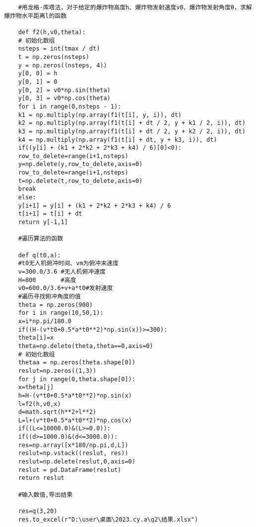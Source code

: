 \documentclass[normalsize]{ctexart}
\begin{document}
\begin{spacing}{1}
\begin{lstlisting}
	#用龙格-库塔法，对于给定的爆炸物高度h、爆炸物发射速度v0、爆炸物发射角度θ，求解爆炸物水平距离l的函数
	
	def f2(h,v0,theta):
	# 初始化数组
	nsteps = int(tmax / dt)
	t = np.zeros(nsteps)
	y = np.zeros((nsteps, 4))
	y[0, 0] = h
	y[0, 1] = 0 
	y[0, 2] = v0*np.sin(theta)
	y[0, 3] = v0*np.cos(theta)
	for i in range(0,nsteps - 1):
	k1 = np.multiply(np.array(f1(t[i], y, i)), dt)
	k2 = np.multiply(np.array(f1(t[i] + dt / 2, y + k1 / 2, i)), dt)
	k3 = np.multiply(np.array(f1(t[i] + dt / 2, y + k2 / 2, i)), dt)
	k4 = np.multiply(np.array(f1(t[i] + dt, y + k3, i)), dt)
	if((y[i] + (k1 + 2*k2 + 2*k3 + k4) / 6)[0]<0):
	row_to_delete=range(i+1,nsteps)
	y=np.delete(y,row_to_delete,axis=0)
	row_to_delete=range(i+1,nsteps)
	t=np.delete(t,row_to_delete,axis=0)
	break
	else:
	y[i+1] = y[i] + (k1 + 2*k2 + 2*k3 + k4) / 6
	t[i+1] = t[i] + dt
	return y[-1,1]
	
	#遍历算法的函数
	
	def q(t0,a):
	#t0无人机俯冲时间、vm为俯冲末速度
	v=300.0/3.6 #无人机俯冲速度
	H=800       #高度
	v0=600.0/3.6+v+a*t0#发射速度
	#遍历寻找俯冲角度的值
	theta = np.zeros(900)
	for i in range(10,50,1):
	x=i*np.pi/180.0
	if((H-(v*t0+0.5*a*t0**2)*np.sin(x))>=300):
	theta[i]=x
	theta=np.delete(theta,theta==0,axis=0)
	# 初始化数组
	thetaa = np.zeros(theta.shape[0])
	reslut=np.zeros((1,3))
	for j in range(0,theta.shape[0]):
	x=theta[j]
	h=H-(v*t0+0.5*a*t0**2)*np.sin(x)
	l=f2(h,v0,x)
	d=math.sqrt(h**2+l**2)
	L=l+(v*t0+0.5*a*t0**2)*np.cos(x)
	if((L<=10000.0)&(L>=0.0)):
	if((d>=1000.0)&(d<=3000.0)):
	res=np.array([x*180/np.pi,d,L])
	reslut=np.vstack((reslut, res))
	reslut=np.delete(reslut,0,axis=0)
	reslut = pd.DataFrame(reslut)
	return reslut
	
	#输入数值,导出结果
	
	res=q(3,20)
	res.to_excel(r"D:\user\桌面\2023.cy.a\q2\结果.xlsx")
			\end{lstlisting}
		\end{spacing}

		\lstset{language=Matlab}
		
\end{document}
